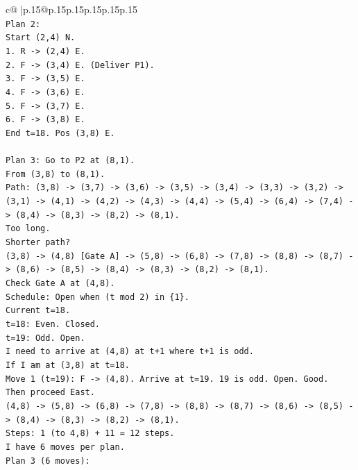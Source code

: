 \documentclass{article}
\begin{document}
{\begin{supertabular}{c@{$\;$}|p{.15\linewidth}@{}p{.15\linewidth}p{.15\linewidth}p{.15\linewidth}p{.15\linewidth}p{.15\linewidth}}
{{{\\ 
\texttt{Plan 2:} \\
\texttt{Start (2,4) N.} \\
\texttt{1. R {-}> (2,4) E.} \\
\texttt{2. F {-}> (3,4) E. (Deliver P1).} \\
\texttt{3. F {-}> (3,5) E.} \\
\texttt{4. F {-}> (3,6) E.} \\
\texttt{5. F {-}> (3,7) E.} \\
\texttt{6. F {-}> (3,8) E.} \\
\texttt{End t=18. Pos (3,8) E.} \\
\\ 
\texttt{Plan 3: Go to P2 at (8,1).} \\
\texttt{From (3,8) to (8,1).} \\
\texttt{Path: (3,8) {-}> (3,7) {-}> (3,6) {-}> (3,5) {-}> (3,4) {-}> (3,3) {-}> (3,2) {-}> (3,1) {-}> (4,1) {-}> (4,2) {-}> (4,3) {-}> (4,4) {-}> (5,4) {-}> (6,4) {-}> (7,4) {-}> (8,4) {-}> (8,3) {-}> (8,2) {-}> (8,1).} \\
\texttt{Too long.} \\
\texttt{Shorter path?} \\
\texttt{(3,8) {-}> (4,8) {[}Gate A{]} {-}> (5,8) {-}> (6,8) {-}> (7,8) {-}> (8,8) {-}> (8,7) {-}> (8,6) {-}> (8,5) {-}> (8,4) {-}> (8,3) {-}> (8,2) {-}> (8,1).} \\
\texttt{Check Gate A at (4,8).} \\
\texttt{Schedule: Open when (t mod 2) in \{1\}.} \\
\texttt{Current t=18.} \\
\texttt{t=18: Even. Closed.} \\
\texttt{t=19: Odd. Open.} \\
\texttt{I need to arrive at (4,8) at t+1 where t+1 is odd.} \\
\texttt{If I am at (3,8) at t=18.} \\
\texttt{Move 1 (t=19): F {-}> (4,8). Arrive at t=19. 19 is odd. Open. Good.} \\
\texttt{Then proceed East.} \\
\texttt{(4,8) {-}> (5,8) {-}> (6,8) {-}> (7,8) {-}> (8,8) {-}> (8,7) {-}> (8,6) {-}> (8,5) {-}> (8,4) {-}> (8,3) {-}> (8,2) {-}> (8,1).} \\
\texttt{Steps: 1 (to 4,8) + 11 = 12 steps.} \\
\texttt{I have 6 moves per plan.} \\
\texttt{Plan 3 (6 moves):} \\
}}}
\end{supertabular}}
\end{document}
